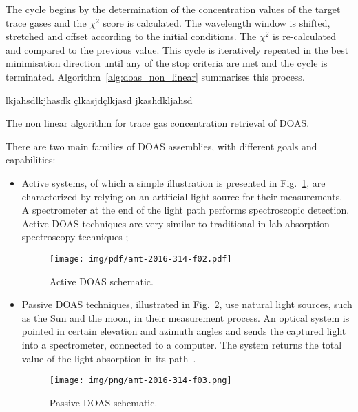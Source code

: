 The cycle begins by the determination of the concentration values of the
target trace gases and the $\chi^2$ score is calculated. The wavelength
window is shifted, stretched and offset according to the initial
conditions. The $\chi^2$ is re-calculated and compared to the previous
value. This cycle is iteratively repeated in the best minimisation
direction until any of the stop criteria are met and the cycle is
terminated. Algorithm~\ref{alg:doas_non_linear} summarises this process.

\begin{algorithm}[htb]
\SetAlgoLined
{}
lkjahsdlkjhasdk
çlkasjdçlkjasd
jkashdkljahsd
\caption{The non linear algorithm for trace gas concentration retrieval
of \gls{DOAS}.}
\label{alg:doas_non_linear}
\end{algorithm}

There are two main families of \gls{DOAS} assemblies, with different
goals and capabilities:

\begin{itemize}

        \item Active systems, of which a simple illustration is
            presented in Fig.~\ref{fig:activeSmall}, are characterized
            by relying on an artificial light source for their
            measurements. A spectrometer at the end of the light path
            performs spectroscopic detection. Active DOAS techniques are
            very similar to traditional in-lab absorption spectroscopy
            techniques \cite{Platt2007};

            \begin{figure}[htb]
                \centering
                \texttt{[image: img/pdf/amt-2016-314-f02.pdf]}
                \caption{Active DOAS schematic.}\label{fig:activeSmall}
              \end{figure}


        \item Passive DOAS techniques, illustrated in
            Fig.~\ref{fig:passiveSchematic}, use natural light sources,
            such as the Sun and the moon, in their measurement process.
            An optical system is pointed in certain elevation and
            azimuth angles and sends the captured light into a
            spectrometer, connected to a computer. The system returns
            the total value of the light absorption in its
            path~\cite{Platt2007,Merlaud2013}.

              \begin{figure}[htb]
                  \centering
                  \texttt{[image: img/png/amt-2016-314-f03.png]}
                  \caption{Passive DOAS schematic.}\label{fig:passiveSchematic}
              \end{figure}

\end{itemize}

